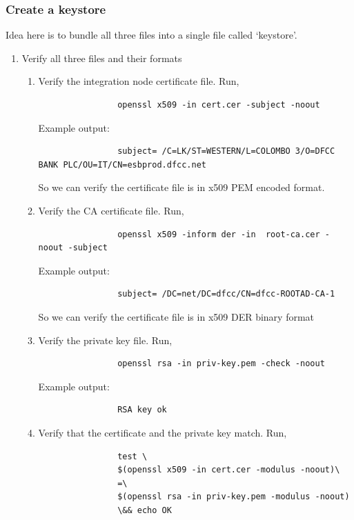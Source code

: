 \documentclass{article}
\begin{document}
    \subsubsection{Create a keystore}
    Idea here is to bundle all three files into a single file called `keystore'.

    \begin{enumerate}
        \item Verify all three files and their formats
        \begin{enumerate}[itemsep=3ex]
            \item Verify the integration node certificate file. Run,
            \begin{lstlisting}
                openssl x509 -in cert.cer -subject -noout
            \end{lstlisting}
            Example output:
            \begin{lstlisting}
                subject= /C=LK/ST=WESTERN/L=COLOMBO 3/O=DFCC BANK PLC/OU=IT/CN=esbprod.dfcc.net
            \end{lstlisting}
            So we can verify the certificate file is in x509 PEM encoded format.

            \item Verify the CA certificate file. Run,
            \begin{lstlisting}
                openssl x509 -inform der -in  root-ca.cer -noout -subject
            \end{lstlisting}
            Example output:
            \begin{lstlisting}
                subject= /DC=net/DC=dfcc/CN=dfcc-ROOTAD-CA-1
            \end{lstlisting}
            So we can verify the certificate file is in x509 DER binary format

            \item Verify the private key file. Run,
            \begin{lstlisting}
                openssl rsa -in priv-key.pem -check -noout
            \end{lstlisting}
            Example output:
            \begin{lstlisting}
                RSA key ok
            \end{lstlisting}

            \item Verify that the certificate and the private key match. Run,
            \begin{lstlisting}
                test \
                $(openssl x509 -in cert.cer -modulus -noout)\
                =\
                $(openssl rsa -in priv-key.pem -modulus -noout)
                \&& echo OK
            \end{lstlisting}
            
        \end{enumerate}
    \end{enumerate}
\end{document}
